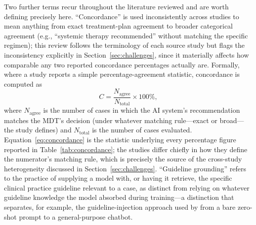 \documentclass[acmsmall,screen=true,review=false,nonacm=true]{acmart}
\begin{document}
Two further terms recur throughout the literature reviewed and are worth defining precisely here. ``Concordance'' is used inconsistently across studies to mean anything from exact treatment-plan agreement to broader categorical agreement (e.g., ``systemic therapy recommended'' without matching the specific regimen); this review follows the terminology of each source study but flags the inconsistency explicitly in Section~\ref{sec:challenges}, since it materially affects how comparable any two reported concordance percentages actually are. Formally, where a study reports a simple percentage-agreement statistic, concordance is computed as
\begin{equation}
  \label{eq:concordance}
  C = \frac{N_{\text{agree}}}{N_{\text{total}}} \times 100\%,
\end{equation}
where $N_{\text{agree}}$ is the number of cases in which the AI system's recommendation matches the MDT's decision (under whatever matching rule---exact or broad---the study defines) and $N_{\text{total}}$ is the number of cases evaluated. Equation~\eqref{eq:concordance} is the statistic underlying every percentage figure reported in Table~\ref{tab:concordance}; the studies differ chiefly in how they define the numerator's matching rule, which is precisely the source of the cross-study heterogeneity discussed in Section~\ref{sec:challenges}. ``Guideline grounding'' refers to the practice of supplying a model with, or having it retrieve, the specific clinical practice guideline relevant to a case, as distinct from relying on whatever guideline knowledge the model absorbed during training---a distinction that separates, for example, the guideline-injection approach used by \citet{ismayilov2025} from a bare zero-shot prompt to a general-purpose chatbot.
\end{document}
